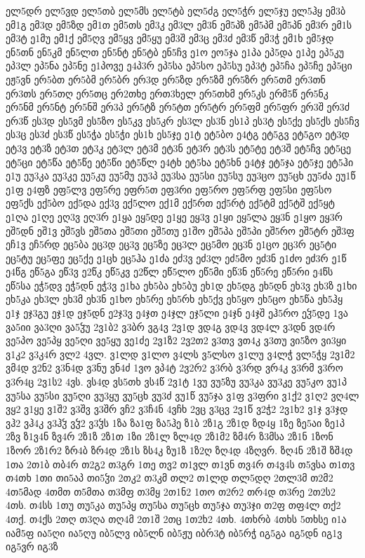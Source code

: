 {ელ5დრ
ელ5ვდ
ელ5თბ
ელ5მს
ელ5ტბ
ელ5ძგ
ელ5ჭრ
ელ5ჯუ
ელ5ჰყ
ემ3ბ
ემ1გ
ემ3დ
ემ5ზდ
ემ1თ
ემ5თს
ემ3კ
ემ3ლ
ემ3ნ
ემ5პზ
ემ5პმ
ემ5პნ
ემ3რ
ემ1ს
ემ3ტ
ე1მუ
ემ1ქ
ემ5ღვ
ემ5ყვ
ემ5ყუ
ემ3შ
ემ3ც
ემ3ძ
ემ3წ
ემ3ჭ
ემ1ხ
ემ5ჯდ
ენ5თნ
ენ5კმ
ენ5ლთ
ენ5ნტ
ენ5ტბ
ენ5ჩვ
ე1ო
ეო5ჯა
ე1პა
ეპ5და
ე1პე
ეპ5კუ
ეპ3ლ
ეპ5ნა
ეპ5ნე
ე1პოვე
ე4პ3რ
ეპ5სა
ეპ5სო
ეპ5სუ
ეპ3ტ
ეპ5ჩა
ეპ5ჩე
ეპ5ცი
ეჟ5ვნ
ერ5ბთ
ერ5ბმ
ერ5ბრ
ერ3დ
ერ5ზდ
ერ5ზმ
ერ5ზრ
ერ5თმ
ერ3თნ
ერ3თს
ერ5თღ
ერ5თც
ერ2თხე
ერთ3ხელ
ერ5თხმ
ერ5კს
ერმ5წ
ერ5ნკ
ერ5ნმ
ერ5ნტ
ერ5ნშ
ერ3პ
ერ5ტზ
ერ5ტთ
ერ5ტრ
ერ5ფმ
ერ5ფრ
ერ3შ
ერ3ძ
ერ3წ
ეს3დ
ეს5ვმ
ეს5ზო
ეს5კვ
ეს5კრ
ეს3ლ
ეს3ნ
ეს1პ
ეს3ტ
ეს5ქე
ეს5ქს
ეს5ჩვ
ეს3ც
ეს3ძ
ეს3წ
ეს5ჭა
ეს5ჭი
ეს1ხ
ეს5ჯე
ე1ტ
ეტ5ბო
ე4ტგ
ეტ5გვ
ეტ5გო
ეტ3დ
ეტ3ვ
ეტ3ზ
ეტ3თ
ეტ3კ
ეტ3ლ
ეტ3მ
ეტ3ნ
ეტ3რ
ეტ3ს
ეტ5ტე
ეტ3შ
ეტ5ჩვ
ეტ5ცე
ეტ5ცი
ეტ5წა
ეტ5წე
ეტ5წი
ეტ5წლ
ე4ტხ
ეტ5ხა
ეტ5ხნ
ე4ტჯ
ეტ5ჯა
ეტ5ჯე
ეტ5ჰი
ე1უ
ეუ3კა
ეუ3კე
ეუ5კუ
ეუ5მუ
ეუ3პ
ეუ3სა
ეუ5სი
ეუ5სუ
ეუ3ცო
ეუ5ცხ
ეუ5ძა
ეუ1წ
ე1ფ
ე4ფზ
ეფ5ლვ
ეფ5რე
ეფრ5თ
ეფ3რი
ეფ5რო
ეფ5რფ
ეფ5სი
ეფ5სო
ეფ5ქს
ექ5ბო
ექ5და
ექ3ვ
ექ5ლო
ექ1მ
ექ5რთ
ექ5რტ
ექ5ტმ
ექ5ტშ
ექ5ყტ
ე1ღა
ე1ღე
ეღ3ვ
ეღ3რ
ე1ყა
ეყ5დე
ე1ყე
ეყ3ვ
ე1ყი
ეყ5ლა
ეყ3ნ
ე1ყო
ეყ3რ
ეშ5დნ
ეშ1ვ
ეშ5ვს
ეშ5თა
ეშ5თი
ეშ5თუ
ე1შო
ეშ5პა
ეშ5პი
ეშ5რო
ეშ5ტრ
ეშ3ფ
ეჩ1ვ
ეჩ5რდ
ეც5ბა
ეც3დ
ეც3ვ
ეც5ზე
ეც3ლ
ეც5მო
ეც3ნ
ე1ცო
ეც3რ
ეც5ტი
ეც5ტუ
ეც5ფე
ეც5ქე
ე1ცხ
ეც5ჰა
ე1ძა
ეძ3ვ
ეძ3ლ
ეძ5მო
ეძ3ნ
ე1ძო
ეძ3რ
ე1წ
ე4წგ
ეწ5გა
ეწ3ვ
ე2წკ
ეწ5კვ
ე2წლ
ეწ5ლო
ეწ5მი
ეწ3ნ
ეწ5რე
ეწ5რი
ე4წს
ეწ5სა
ეჭ5დვ
ეჭ5დნ
ეჭ3ვ
ე1ხა
ეხ5ბა
ეხ5ბუ
ეხ1დ
ეხ5დგ
ეხ5დნ
ეხ3ვ
ეხ3ზ
ე1ხი
ეხ5კა
ეხ3ლ
ეხ3მ
ეხ3ნ
ე1ხო
ეხ5რე
ეხ5რხ
ეხ5ქვ
ეხ5ყო
ეხ5ცო
ეხ5წა
ეხ5ჰყ
ე1ჯ
ეჯ3გუ
ეჯ1დ
ეჯ5დნ
ე2ჯ3ვ
ე4ჯთ
ე4ჯლ
ეჯ5ლი
ე4ჯნ
ე4ჯშ
ეჰ5რო
ეჴ5დე
1ვა
ვა5იი
ვა3ღი
ვა5ჴუ
2ვ1ბ2
ვ3ბრ
ვგ4ვ
2ვ1დ
ვდ4გ
ვდ4ვ
ვდ4ლ
ვ3დნ
ვდ4რ
ვე5პო
ვე5პყ
ვე5ღი
ვე5ყუ
ვე1ძე
2ვ1ზ2
2ვ2თ2
ვ3თვ
ვთ4კ
ვ3თუ
ვი5ზო
ვი3ყი
ვ1კ2
ვ3კ4რ
ვლ2
4ვლ.
ვ1ლდ
ვ1ლო
ვ4ლს
ვ5ლსო
ვ1ლუ
ვ4ლჭ
ვლ5ჭყ
2ვ1მ2
ვმ4დ
ვ2ნ2
ვ3ნ4დ
ვ3ნუ
ვნ4ძ
1ვო
ვპ4ტ
2ვ2რ2
ვ3რბ
ვ3რდ
ვრ4კ
ვ3რმ
ვ3რო
ვ3რ4ც
2ვ1ს2
4ვს.
ვს4დ
ვს5თხ
ვს4წ
2ვ1ტ
1ვუ
ვუ5ზუ
ვუ3კა
ვუ3კე
ვუ5კო
ვუ1პ
ვუ5სა
ვუ5სი
ვუ5ღი
ვუ3ყუ
ვუ5ცხ
ვუ3ძ
ვუ1წ
ვუ5ჯა
ვ1ფ
ვ3ფრი
ვ1ქ2
ვ1ღ2
ვღ4ლ
ვყ2
ვ1ყე
ვ1შ2
ვ3შვ
ვ3შრ
ვჩ2
ვ3ჩ4ნ
4ვჩხ
2ვც
ვ3ცვ
2ვ1წ
ვ2ჭ2
2ვ1ხ2
ვ1ჯ
ვ3ჯდ
ვჰ2
ვჰ4კ
ვ3ჰჴ
ვჴ2
ვ3ჴს
1ზა
ზა1ფ
ზა5ჰე
ზ1ბ
2ზ1გ
2ზ1დ
ზდ4ყ
1ზე
ზე5აი
ზე1პ
2ზვ
ზ1ვ4ნ
ზვ4რ
2ზ1ზ
2ზ1თ
1ზი
2ზ1ლ
ზლ4დ
2ზ1მ2
ზმ4რ
ზ3მსა
2ზ1ნ
1ზონ
1ზორ
2ზ1რ2
ზრ4ბ
ზრ4დ
2ზ1ს
ზს4კ
ზუ1ზ
1ზ2ღ
ზღ4დ
4ზღვრ.
ზღ4ნ
2ზ1შ
ზშ4დ
1თა
2თ1ბ
თბ4რ
თ2გ2
თ3გრ
1თე
თვ2
თ1ვლ
თ1ვნ
თვ4რ
თ4ვ4ს
თ5ვსა
თ1თვ
თ4თხ
1თი
თი5აპ
თი5ჴი
2თკ2
თ3კმ
თლ2
თ1ლდ
თლ5დღ
2თლ3მ
თ2მ2
4თ5მად
4თმთ
თ5მთა
თ3მფ
თ3მყ
2თ1ნ2
1თო
თ2რ2
თრ4დ
თ3რე
2თ2ს2
4თს.
თ4სს
1თუ
თუ5კა
თუ5პყ
თუ5სა
თუ5ცხ
თუ5ჯა
თუ3ჯი
თ2ფ
თფ4ლ
თქ2
4თქ.
თ4ქს
2თღ
თ3ღა
თღ4მ
2თ1შ
2თც
1თ2ხ2
4თხ.
4თხრბ
4თხს
5თხსე
ი1ა
იამ5ფ
ია5ღი
ია5ღუ
იბ5ლვ
იბ5ლნ
იბ5ჟუ
იბრ3ტ
იბ5რჭ
იგ5გა
იგ5დნ
იგ1ვ
იგ5ვრ
იგ3ზ
}
